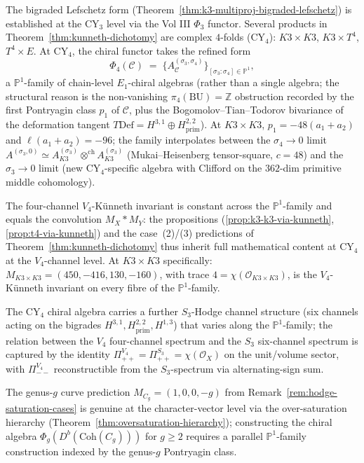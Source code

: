 \begin{remark}
\label{rem:kunneth-cy4-scope}
The bigraded Lefschetz form
\textup{(}Theorem~\ref{thm:k3-multiproj-bigraded-lefschetz}\textup{)} is
established at the CY$_3$ level via the Vol III $\Phi_3$ functor.
Several products in Theorem~\ref{thm:kunneth-dichotomy} are complex
$4$-folds (CY$_4$): $K3 \times K3$, $K3 \times T^4$, $T^4 \times E$.
At CY$_4$, the chiral functor takes the refined form
\[
 \Phi_4(\mathcal{C})
 \;=\; \bigl\{A^{(\sigma_3, \sigma_4)}_{\mathcal{C}}\bigr\}_{[\sigma_3 : \sigma_4] \in \mathbb{P}^1},
\]
a $\mathbb{P}^1$-family of chain-level $E_1$-chiral algebras
\textup{(}rather than a single algebra; the structural reason is the
non-vanishing $\pi_4(\mathrm{BU}) = \mathbb{Z}$ obstruction recorded
by the first Pontryagin class $p_1$ of $\mathcal{C}$, plus the
Bogomolov--Tian--Todorov bivariance of the deformation tangent
$T \mathrm{Def} = H^{3, 1} \oplus H^{2, 2}_{\mathrm{prim}}$\textup{).}
At \(K3 \times K3\), \(p_1=-48(a_1+a_2)\) and
\(\ell(a_1+a_2)=-96\); the family interpolates between
the $\sigma_4 \to 0$ limit
$A^{(\sigma_3, 0)} \simeq A_{K3}^{(\sigma_3)} \otimes^{\mathrm{ch}}
A_{K3}^{(\sigma_3)}$ \textup{(}Mukai--Heisenberg tensor-square,
$c = 48$\textup{)} and the $\sigma_3 \to 0$ limit
\textup{(}new CY$_4$-specific algebra with Clifford on the $362$-dim
primitive middle cohomology\textup{).}

The four-channel $V_4$-Künneth invariant is constant across the
$\mathbb{P}^1$-family and equals the convolution $M_X * M_Y$: the
propositions
\textup{(}\ref{prop:k3-k3-via-kunneth}, \ref{prop:t4-via-kunneth}\textup{)}
and the case~(2)/(3) predictions of
Theorem~\ref{thm:kunneth-dichotomy} thus inherit full mathematical
content at CY$_4$ at the $V_4$-channel level. At $K3 \times K3$
specifically: $M_{K3 \times K3} = (450, -416, 130, -160)$, with trace
$4 = \chi(\mathcal{O}_{K3 \times K3})$, is the $V_4$-Künneth invariant
on every fibre of the $\mathbb{P}^1$-family.

The CY$_4$ chiral algebra carries a further $S_3$-Hodge channel
structure (six channels acting on the bigrades
$H^{3, 1}, H^{2, 2}_{\mathrm{prim}}, H^{1, 3}$) that varies along the
$\mathbb{P}^1$-family; the relation between the $V_4$ four-channel
spectrum and the $S_3$ six-channel spectrum is captured by the
identity $\Pi_{++}^{V_4} = \Pi_{++}^{S_3} = \chi(\mathcal{O}_X)$ on
the unit/volume sector, with $\Pi_{--}^{V_4}$ reconstructible from the
$S_3$-spectrum via alternating-sign sum.

The genus-$g$ curve prediction $M_{C_g} = (1, 0, 0, -g)$ from
Remark~\ref{rem:hodge-saturation-cases} is genuine at the
character-vector level via the over-saturation hierarchy
\textup{(}Theorem~\ref{thm:oversaturation-hierarchy}\textup{);}
constructing the chiral algebra $\Phi_g(D^b(\mathrm{Coh}(C_g)))$ for
$g \geq 2$ requires a parallel $\mathbb{P}^1$-family construction
indexed by the genus-$g$ Pontryagin class.
\end{remark}


